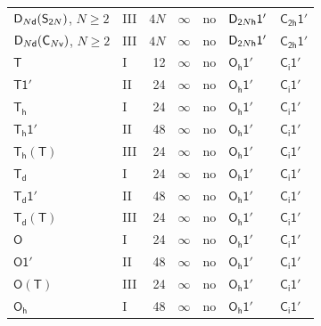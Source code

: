 \documentclass[10pt,a4paper]{article}
\makeatletter
\def\grouprule#1#2{\noalign{\marks\LTgroupmarks{\the\belowrulesep}\nobreak\vskip#1%
  \vskip\aboverulesep}\multispan\LT@cols\unskip{\leaders\hrule\@height#2\hfill\kern\z@}\cr
  \noalign{\penalty\LTrulebreak\vskip\belowrulesep\global\@lastruleclass\z@}}
\numberwithin{equation}{section}
\newcommand{\grp}[1]{\mathsf{#1}}
\makeatother
\begin{document}
{\begin{longtable}{@{}llrrlll@{}}
$\grp{D_{\mathnormal{N}d}}(\grp{S_{2\mathnormal{N}}})$, $N \ge 2$ & III & $4N$ & $\infty$ & no & $\grp{D_{2\mathnormal{N}h}1'}$ & \href{C2h-1p.pdf}{$\grp{C_{2h}1'}$}\\
$\grp{D_{\mathnormal{N}d}}(\grp{C_{\mathnormal{N}v}})$, $N \ge 2$ & III & $4N$ & $\infty$ & no & $\grp{D_{2\mathnormal{N}h}1'}$ & \href{C2h-1p.pdf}{$\grp{C_{2h}1'}$}\\
\grouprule{0pt}{\lightrulewidth}
\href{../../../rotation/data/pdf/T.pdf}{$\grp{T}$} & I & 12 & $\infty$ & no & \href{Oh-1p.pdf}{$\grp{O_{h}1'}$} & \href{S2-1p.pdf}{$\grp{C_{i}1'}$}\\
\href{T-1p.pdf}{$\grp{T1'}$} & II & 24 & $\infty$ & no & \href{Oh-1p.pdf}{$\grp{O_{h}1'}$} & \href{S2-1p.pdf}{$\grp{C_{i}1'}$}\\
\href{../../../rotation/data/pdf/Th.pdf}{$\grp{T_{h}}$} & I & 24 & $\infty$ & no & \href{Oh-1p.pdf}{$\grp{O_{h}1'}$} & \href{S2-1p.pdf}{$\grp{C_{i}1'}$}\\
\href{Th-1p.pdf}{$\grp{T_{h}1'}$} & II & 48 & $\infty$ & no & \href{Oh-1p.pdf}{$\grp{O_{h}1'}$} & \href{S2-1p.pdf}{$\grp{C_{i}1'}$}\\
\href{Th-T.pdf}{$\grp{T_{h}}(\grp{T})$} & III & 24 & $\infty$ & no & \href{Oh-1p.pdf}{$\grp{O_{h}1'}$} & \href{S2-1p.pdf}{$\grp{C_{i}1'}$}\\
\href{../../../rotation/data/pdf/Td.pdf}{$\grp{T_{d}}$} & I & 24 & $\infty$ & no & \href{Oh-1p.pdf}{$\grp{O_{h}1'}$} & \href{S2-1p.pdf}{$\grp{C_{i}1'}$}\\
\href{Td-1p.pdf}{$\grp{T_{d}1'}$} & II & 48 & $\infty$ & no & \href{Oh-1p.pdf}{$\grp{O_{h}1'}$} & \href{S2-1p.pdf}{$\grp{C_{i}1'}$}\\
\href{Td-T.pdf}{$\grp{T_{d}}(\grp{T})$} & III & 24 & $\infty$ & no & \href{Oh-1p.pdf}{$\grp{O_{h}1'}$} & \href{S2-1p.pdf}{$\grp{C_{i}1'}$}\\
\href{../../../rotation/data/pdf/O.pdf}{$\grp{O}$} & I & 24 & $\infty$ & no & \href{Oh-1p.pdf}{$\grp{O_{h}1'}$} & \href{S2-1p.pdf}{$\grp{C_{i}1'}$}\\
\href{O-1p.pdf}{$\grp{O1'}$} & II & 48 & $\infty$ & no & \href{Oh-1p.pdf}{$\grp{O_{h}1'}$} & \href{S2-1p.pdf}{$\grp{C_{i}1'}$}\\
\href{O-T.pdf}{$\grp{O}(\grp{T})$} & III & 24 & $\infty$ & no & \href{Oh-1p.pdf}{$\grp{O_{h}1'}$} & \href{S2-1p.pdf}{$\grp{C_{i}1'}$}\\
\href{../../../rotation/data/pdf/Oh.pdf}{$\grp{O_{h}}$} & I & 48 & $\infty$ & no & \href{Oh-1p.pdf}{$\grp{O_{h}1'}$} & \href{S2-1p.pdf}{$\grp{C_{i}1'}$}\\

\end{longtable}}
\end{document}
